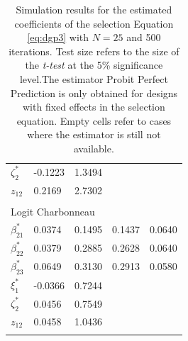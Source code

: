 \begin{table}
\begin{tabular}{p{3cm}p{1.8cm}p{1.8cm}p{1.8cm}p{1.8cm}}
    $\zeta_{2}^*$ & -0.1223 & 1.3494 & & \\
    $z_{12}$ & 0.2169 & 2.7302 &  & \\
    & & & & \\
    \hline
    \multicolumn{5}{l}{Logit Charbonneau} \\
    $\beta_{21}^*$ & 0.0374 & 0.1495 & 0.1437 & 0.0640\\
    $\beta_{22}^*$ & 0.0379 & 0.2885 & 0.2628 & 0.0640\\
    $\beta_{23}^*$ & 0.0649 & 0.3130 & 0.2913 & 0.0580\\
    $\xi_{1}^*$ & -0.0366 & 0.7244 & & \\
    $\zeta_{2}^*$ & 0.0456 & 0.7549 & & \\
     $z_{12}$ & 0.0458 & 1.0436 &  & \\
     & & & & \\
   \hline
\end{tabular}
\caption{\footnotesize{Simulation results for the estimated coefficients of the selection Equation \ref{eq:dgp3} with $N=25$ and 500 iterations. Test size refers to the size of the \textit{t-test} at the 5\% significance level.The estimator Probit Perfect Prediction is only obtained for designs with fixed effects in the selection equation. Empty cells refer to cases where the estimator is still not available.}}
\label{tab:2}
\end{table}
